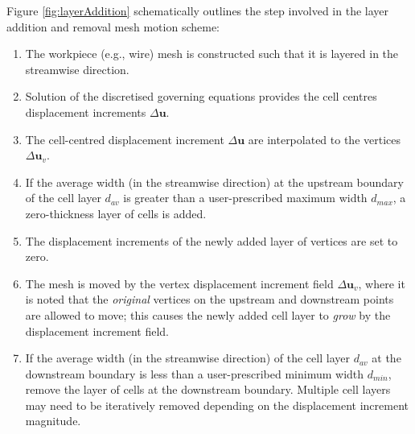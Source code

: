 \documentclass[sn-mathphys,Numbered]{sn-jnl}%
\newcommand{\bb}{\boldsymbol}
\begin{document}
Figure \ref{fig:layerAddition} schematically outlines the step involved in the layer addition and removal mesh motion scheme:
\begin{enumerate}[label=(\alph*)]
	\item The workpiece (e.g., wire) mesh is constructed such that it is layered in the streamwise direction.
	\item Solution of the discretised governing equations provides the cell centres displacement increments $\Delta \bb{u}$.
	\item The cell-centred displacement increment $\Delta \bb{u}$ are interpolated to the vertices $\Delta \bb{u}_v$.
	\item If the average width (in the streamwise direction) at the upstream boundary of the cell layer $d_{av}$ is greater than a user-prescribed maximum width $d_{max}$, a zero-thickness layer of cells is added.
	\item The displacement increments of the newly added layer of vertices are set to zero.
	\item The mesh is moved by the vertex displacement increment field $\Delta \bb{u}_v$, where it is noted that the \emph{original} vertices on the upstream and downstream points are allowed to move; this causes the newly added cell layer to \emph{grow} by the displacement increment field. 
	\item If the average width (in the streamwise direction) of the cell layer $d_{av}$ at the downstream boundary is less than a user-prescribed minimum width $d_{min}$, remove the layer of cells at the downstream boundary. Multiple cell layers may need to be iteratively removed depending on the displacement increment magnitude.
\end{enumerate}
\end{document}
